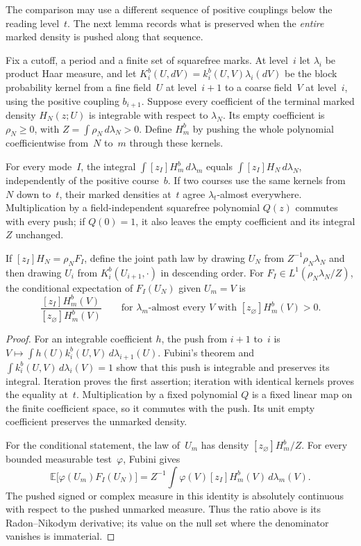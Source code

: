 The comparison may use a different sequence of positive couplings below
the reading level~$t$. The next lemma records what is preserved when
the \emph{entire} marked density is pushed along that sequence.
\begin{lemma}\label{lem:E-course-mass}
Fix a cutoff, a period and a finite set of squarefree marks. At level~$i$
let $\lambda_i$ be product Haar measure, and let
$K_i^b(U,dV)=k_i^b(U,V)\lambda_i(dV)$ be the block probability kernel
from a fine field~$U$ at level~$i+1$ to a coarse field~$V$ at level~$i$,
using the positive coupling $b_{i+1}$. Suppose every coefficient of
the terminal marked density $H_N(z;U)$ is integrable with respect to
$\lambda_N$. Its empty coefficient is $\rho_N\ge0$, with
$Z=\int\rho_N\,d\lambda_N>0$. Define $H_m^b$ by pushing the whole
polynomial coefficientwise from~$N$ to~$m$ through these kernels.

For every mode~$I$, the integral $\int[z_I]H_m^b\,d\lambda_m$ equals
$\int[z_I]H_N\,d\lambda_N$, independently of the positive course~$b$.
If two courses use the same kernels from~$N$ down to~$t$, their marked
densities at~$t$ agree $\lambda_t$-almost everywhere. Multiplication by
a field-independent squarefree polynomial $Q(z)$ commutes with every
push; if $Q(0)=1$, it also leaves the empty coefficient and its integral
$Z$ unchanged.

If $[z_I]H_N=\rho_NF_I$, define the joint path law by drawing $U_N$ from
$Z^{-1}\rho_N\lambda_N$ and then drawing $U_i$ from
$K_i^b(U_{i+1},\cdot)$ in descending order. For
$F_I\in L^1(\rho_N\lambda_N/Z)$, the conditional expectation of
$F_I(U_N)$ given $U_m=V$ is
\[
 \frac{[z_I]H_m^b(V)}{[z_\varnothing]H_m^b(V)}
 \qquad\text{for }\lambda_m\text{-almost every }V\text{ with }[z_\varnothing]H_m^b(V)>0.
\]
\end{lemma}
\begin{proof}
For an integrable coefficient $h$, the push from $i+1$ to~$i$ is
$V\mapsto\int h(U)k_i^b(U,V)\,d\lambda_{i+1}(U)$. Fubini's theorem and
$\int k_i^b(U,V)\,d\lambda_i(V)=1$ show that this push is integrable
and preserves its integral. Iteration proves the first assertion;
iteration with identical kernels proves the equality at~$t$. Multiplication
by a fixed polynomial $Q$ is a fixed linear map on the finite coefficient
space, so it commutes with the push. Its unit empty coefficient preserves
the unmarked density.

For the conditional statement, the law of~$U_m$ has density
$[z_\varnothing]H_m^b/Z$. For every bounded measurable test~$\varphi$,
Fubini gives
\[
 \mathbb E\bigl[\varphi(U_m)F_I(U_N)\bigr]
 =Z^{-1}\int\varphi(V)[z_I]H_m^b(V)\,d\lambda_m(V).
\]
The pushed signed or complex measure in this identity is absolutely
continuous with respect to the pushed unmarked measure. Thus the ratio
above is its Radon--Nikodym derivative; its value on the null set where
the denominator vanishes is immaterial.
\end{proof}
